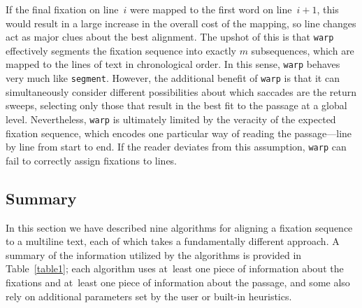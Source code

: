 \documentclass[doc,biblatex]{apa7}
\begin{document}
If the final fixation on line~$i$ were mapped to the first word on line~$i+1$, this would result in a large increase in the overall cost of the mapping, so line changes act as major clues about the best alignment. The upshot of this is that \texttt{warp} effectively segments the fixation sequence into exactly $m$ subsequences, which are mapped to the lines of text in chronological order. In this sense, \texttt{warp} behaves very much like \texttt{segment}. However, the additional benefit of \texttt{warp} is that it can simultaneously consider different possibilities about which saccades are the return sweeps, selecting only those that result in the best fit to the passage at a global level. Nevertheless, \texttt{warp} is ultimately limited by the veracity of the expected fixation sequence, which encodes one particular way of reading the passage---line by line from start to end. If the reader deviates from this assumption, \texttt{warp} can fail to correctly assign fixations to lines.

\subsection{Summary}

In this section we have described nine algorithms for aligning a fixation sequence to a multiline text, each of which takes a fundamentally different approach. A summary of the information utilized by the algorithms is provided in Table~\ref{table1}; each algorithm uses at~least one piece of information about the fixations and at~least one piece of information about the passage, and some also rely on additional parameters set by the user or built-in heuristics.
\end{document}
